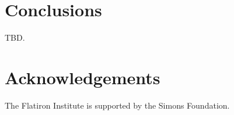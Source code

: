 \documentclass[a4paper,fleqn,usenatbib]{mnras}
\begin{document}

\section{Conclusions}

TBD.


\section*{Acknowledgements}

The Flatiron Institute is supported by the Simons Foundation.


%



\bsp	%
\label{lastpage}
\end{document}
